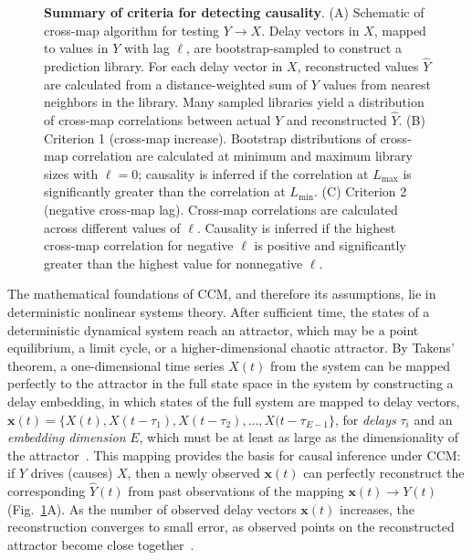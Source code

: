 \documentclass[10pt,letterpaper]{article}
\newcommand{\bx}{\mathbf{x}}
\newcommand{\hY}{\hat{Y}}
\begin{document}
\begin{figure}
    \caption{\textbf{Summary of criteria for detecting causality}. (A) Schematic of cross-map algorithm for testing $Y \rightarrow X$. Delay vectors in $X$, mapped to values in $Y$ with lag $\ell$, are bootstrap-sampled to construct a prediction library. For each delay vector in $X$, reconstructed values $\hat{Y}$ are calculated from a distance-weighted sum of $Y$ values from nearest neighbors in the library. Many sampled libraries yield a distribution of cross-map correlations between actual $Y$ and reconstructed $\hat{Y}$. (B) Criterion 1 (cross-map increase). Bootstrap distributions of cross-map correlation are calculated at minimum and maximum library sizes with $\ell = 0$; causality is inferred if the correlation at $L_{\max}$ is significantly greater than the correlation at $L_{\min}$. (C) Criterion 2 (negative cross-map lag). Cross-map correlations are calculated across different values of $\ell$. Causality is inferred if the highest cross-map correlation for negative $\ell$ is positive and significantly greater than the highest value for nonnegative $\ell$. \label{fig:conceptual}}
\end{figure}

The mathematical foundations of CCM, and therefore its assumptions, lie in deterministic nonlinear systems theory.
After sufficient time, the states of a deterministic dynamical system reach an attractor, which may be a point equilibrium, a limit cycle, or a higher-dimensional chaotic attractor.
By Takens' theorem, a one-dimensional time series $X(t)$ from the system can be mapped perfectly to the attractor in the full state space in the system by constructing a delay embedding, in which states of the full system are mapped to delay vectors, $\bx(t) = \{X(t), X(t - \tau_1), X(t - \tau_2), \ldots, X(t - \tau_{E-1} \}$, for \emph{delays} $\tau_i$ and an \emph{embedding dimension} $E$, which must be at least as large as the dimensionality of the attractor~\cite{Takens1981}.
This mapping provides the basis for causal inference under CCM: if $Y$ drives (causes) $X$, then a newly observed $\bx(t)$ can perfectly reconstruct the corresponding $\hY(t)$ from past observations of the mapping $\bx(t) \rightarrow Y(t)$ (Fig.~\ref{fig:conceptual}A).
As the number of observed delay vectors $\bx(t)$ increases, the reconstruction converges to small error, as observed points on the reconstructed attractor become close together~\cite{Sugihara2012}.
\end{document}
